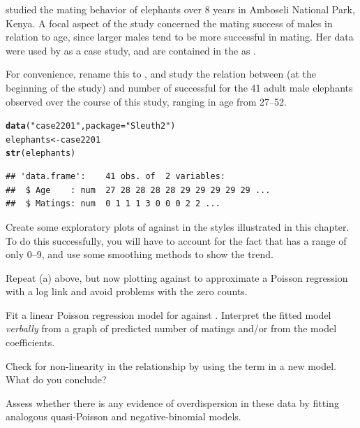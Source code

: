 \documentclass[11pt]{book}\usepackage[]{graphicx}\usepackage[]{color}
\makeatletter
\newcommand{\hlstr}[1]{\textcolor[rgb]{0.192,0.494,0.8}{#1}}%
\newcommand{\hlstd}[1]{\textcolor[rgb]{0.345,0.345,0.345}{#1}}%
\newcommand{\hlkwb}[1]{\textcolor[rgb]{0.69,0.353,0.396}{#1}}%
\newcommand{\hlkwc}[1]{\textcolor[rgb]{0.333,0.667,0.333}{#1}}%
\newcommand{\hlkwd}[1]{\textcolor[rgb]{0.737,0.353,0.396}{\textbf{#1}}}%
\newenvironment{kframe}{%
 \def\at@end@of@kframe{}%
 \ifinner\ifhmode%
  \def\at@end@of@kframe{\end{minipage}}%
  \begin{minipage}{\columnwidth}%
 \fi\fi%
 \def\FrameCommand##1{\hskip\@totalleftmargin \hskip-\fboxsep
 \colorbox{shadecolor}{##1}\hskip-\fboxsep
     \hskip-\linewidth \hskip-\@totalleftmargin \hskip\columnwidth}%
 \MakeFramed {\advance\hsize-\width
   \@totalleftmargin\z@ \linewidth\hsize
   \@setminipage}}%
 {\par\unskip\endMakeFramed%
 \at@end@of@kframe}
\newenvironment{knitrout}{}{} %
\renewenvironment{knitrout}{\small\renewcommand{\baselinestretch}{.85}}{} %
\makeatother
\begin{document}
\begin{Exercises}

  \exercise \citet{Poole:1989} studied the mating behavior of elephants over 8 years in Amboseli National Park,
  Kenya. A focal aspect of the study concerned the mating success of males in relation to age, since larger
  males tend to be more successful in mating.  Her data were used by \citet[]{RamseySchafer:2002} 
  as a case study, and are contained in the  \citep{Sleuth2} as .

  For convenience, rename this to , and study the relation between  
  (at the beginning of the study) and number of successful 
  for the 41 adult male elephants observed over the course of this study, ranging in age from 27--52.
\begin{knitrout}
\color{fgcolor}\begin{kframe}
\begin{alltt}
\hlkwd{data}\hlstd{(}\hlstr{"case2201"}\hlstd{,} \hlkwc{package}\hlstd{=}\hlstr{"Sleuth2"}\hlstd{)}
\hlstd{elephants} \hlkwb{<-} \hlstd{case2201}
\hlkwd{str}\hlstd{(elephants)}
\end{alltt}
\begin{verbatim}
## 'data.frame':	41 obs. of  2 variables:
##  $ Age    : num  27 28 28 28 28 29 29 29 29 29 ...
##  $ Matings: num  0 1 1 1 3 0 0 0 2 2 ...
\end{verbatim}
\end{kframe}
\end{knitrout}
  \begin{enumerate*}
    \item Create some exploratory plots of  against  in the styles illustrated in this chapter.
    To do this successfully, you will have to account for the fact that  has a range of only
    0--9, and use some smoothing methods to show the trend.
    \item Repeat (a) above, but now plotting  against  to approximate a
    Poisson regression with a log link and avoid problems with the zero counts.
    \item Fit a linear Poisson regression model for  against .  Interpret the
    fitted model \emph{verbally} from a graph of predicted number of matings and/or from the model
    coefficients.
    \item Check for non-linearity in the relationship by using the term  in a new
    model.  What do you conclude?
    \item Assess whether there is any evidence of overdispersion in these data by fitting analogous
    quasi-Poisson and negative-binomial models.
  \end{enumerate*}


\end{Exercises}
\end{document}
